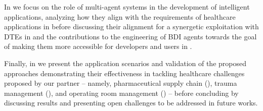 In  we focus on the role of multi-agent systems in the development of intelligent applications, analyzing how they align with the requirements of healthcare applications in  before discussing their alignment for a synergetic exploitation with \acp{DTE} in  and the contributions to the engineering of \ac{BDI} agents towards the goal of making them more accessible for developers and users in .

Finally, in  we present the application scenarios and validation of the proposed approaches demonstrating their effectiveness in tackling healthcare challenges proposed by our partner \ausl{}
-- namely, pharmaceutical supply chain (), trauma management (), and operating room management () --
before concluding by discussing results and presenting open challenges to be addressed in future works.